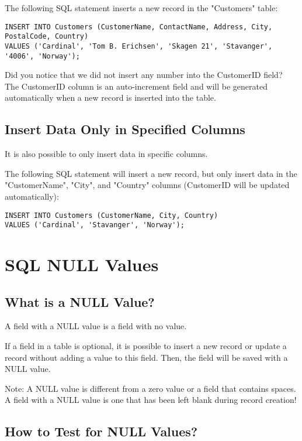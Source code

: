\documentclass[a4paper,12pt]{article}
\begin{document}
The following SQL statement inserts a new record in the "Customers" table:

\begin{lstlisting}
INSERT INTO Customers (CustomerName, ContactName, Address, City, PostalCode, Country)
VALUES ('Cardinal', 'Tom B. Erichsen', 'Skagen 21', 'Stavanger', '4006', 'Norway');
\end{lstlisting}


Did you notice that we did not insert any number into the CustomerID field?
The CustomerID column is an auto-increment field and will be generated automatically when a new record is inserted into the table.


\subsection{Insert Data Only in Specified Columns}

It is also possible to only insert data in specific columns.

The following SQL statement will insert a new record, but only insert data in the "CustomerName", "City", and "Country" columns (CustomerID will be updated automatically):


\begin{lstlisting}
INSERT INTO Customers (CustomerName, City, Country)
VALUES ('Cardinal', 'Stavanger', 'Norway');
\end{lstlisting}



\section{SQL NULL Values}

\subsection{What is a NULL Value?}

A field with a NULL value is a field with no value.

If a field in a table is optional, it is possible to insert a new record or update a record without adding a value to this field. Then, the field will be saved with a NULL value.


Note: A NULL value is different from a zero value or a field that contains spaces. A field with a NULL value is one that has been left blank during record creation!


\subsection{How to Test for NULL Values?}
\end{document}
